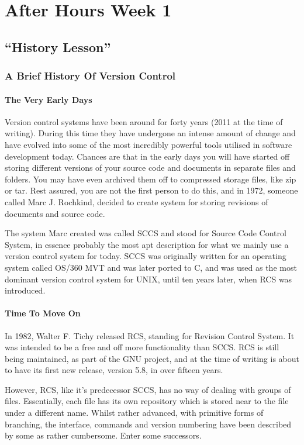 \chapter{After Hours Week 1}
\section{``History Lesson''}
\subsection{A Brief History Of Version Control}

\subsubsection{The Very Early Days}
Version control systems have been around for forty years (2011 at the time of writing).  During this time they have undergone an intense amount of change and have evolved into some of the most incredibly powerful tools utilised in software development today.  Chances are that in the early days you will have started off storing different versions of your source code and documents in separate files and folders.  You may have even archived them off to compressed storage files, like zip or tar.  Rest assured, you are not the first person to do this, and in 1972, someone called Marc J. Rochkind, decided to create system for storing revisions of documents and source code.

The system Marc created was called SCCS and stood for Source Code Control System, in essence probably the most apt description for what we mainly use a version control system for today.  SCCS was originally written for an operating system called OS/360 MVT and was later ported to C, and was used as the most dominant version control system for UNIX, until ten years later, when RCS was introduced.

\subsubsection{Time To Move On}
In 1982, Walter F. Tichy released RCS, standing for Revision Control System.  It was intended to be a free and off more functionality than SCCS.  RCS is still being maintained, as part of the GNU project, and at the time of writing is about to have its first new release, version 5.8, in over fifteen years.

However, RCS, like it's predecessor SCCS, has no way of dealing with groups of files.  Essentially, each file has its own repository which is stored near to the file under a different name.  Whilst rather advanced, with primitive forms of branching, the interface, commands and version numbering have been described by some as rather cumbersome.  Enter some successors.

